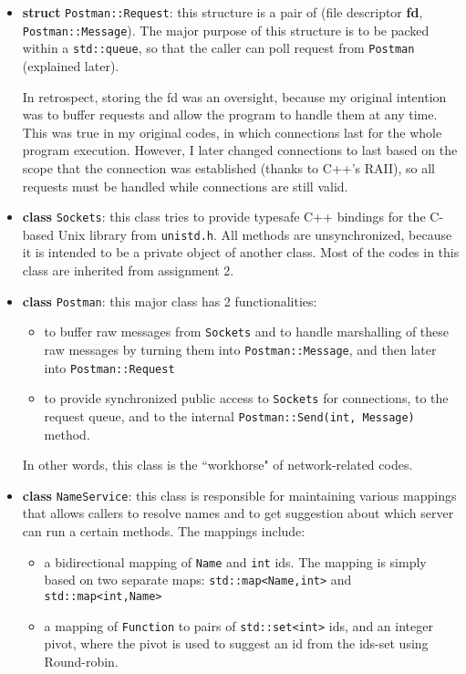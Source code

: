 \begin{itemize}
\item
{\bf struct} {\tt Postman::Request}: this structure is a pair of (file descriptor {\bf fd}, {\tt Postman::Message}).
The major purpose of this structure is to be packed within a {\tt std::queue}, so that the caller can poll request from {\tt Postman} (explained later).

In retrospect, storing the fd was an oversight, because my original intention was to buffer requests and allow the program to handle them at any time.
This was true in my original codes, in which connections last for the whole program execution.
However, I later changed connections to last based on the scope that the connection was established (thanks to C++'s RAII), so all requests must be handled while connections are still valid.

\item
{\bf class} {\tt Sockets}: this class tries to provide typesafe C++ bindings for the C-based Unix library from {\tt unistd.h}.
All methods are unsynchronized, because it is intended to be a private object of another class.
Most of the codes in this class are inherited from assignment 2.

\item
{\bf class} {\tt Postman}: this major class has 2 functionalities:
\begin{itemize}
\item
to buffer raw messages from {\tt Sockets} and to handle marshalling of these raw messages by turning them into {\tt Postman::Message}, and then later into {\tt Postman::Request}
\item
to provide synchronized public access to {\tt Sockets} for connections, to the request queue, and to the internal {\tt Postman::Send(int, Message)} method.
\end{itemize}

In other words, this class is the ``workhorse" of network-related codes.

\item
{\bf class} {\tt NameService}: this class is responsible for maintaining various mappings that allows callers to resolve names and to get suggestion about which server can run a certain methods.
The mappings include:
\begin{itemize}
\item
a bidirectional mapping of {\tt Name} and {\tt int} ids.
The mapping is simply based on two separate maps: {\tt std::map<Name,int>} and {\tt std::map<int,Name>}
\item
a mapping of {\tt Function} to pairs of {\tt std::set<int>} ids, and an integer pivot, where the pivot is used to suggest an id from the ids-set using Round-robin.
\end{itemize}


\end{itemize}
